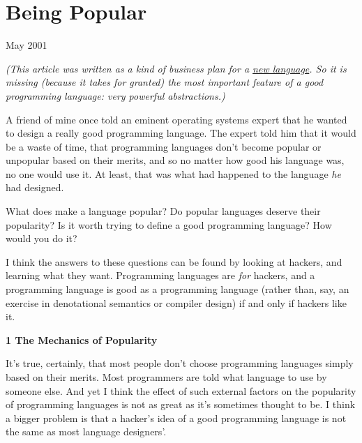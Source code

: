 \chapter{Being Popular}


            
              
                

May 2001

\emph{(This article was written as a kind of business plan for a
                    \href{http://www.paulgraham.com/arc.html}{new language}. So it is missing
                    (because it takes for granted) the most important feature of
                    a good programming language: very powerful abstractions.)}

A friend of mine once told an eminent operating
                  systems expert that he wanted to design a really good
                  programming language. The expert told him that it would be a
                  waste of time, that programming languages don't become popular
                  or unpopular based on their merits, and so no matter how good
                  his language was, no one would use it. At least, that was what
                  had happened to the language \emph{he} had designed.

What
                  does make a language popular? Do popular languages deserve
                  their popularity? Is it worth trying to define a good
                  programming language? How would you do it?

I think
                  the answers to these questions can be found by looking at
                  hackers, and learning what they want. Programming languages
                  are \emph{for} hackers, and a programming language is good as
                  a programming language (rather than, say, an exercise in
                  denotational semantics or compiler design) if and only if
                  hackers like it.

\textbf{1 The Mechanics of Popularity}

It's true, certainly, that most people don't
                  choose programming languages simply based on their merits.
                  Most programmers are told what language to use by someone
                  else. And yet I think the effect of such external factors on
                  the popularity of programming languages is not as great as
                  it's sometimes thought to be. I think a bigger problem is that
                  a hacker's idea of a good programming language is not the same
                  as most language designers'.

